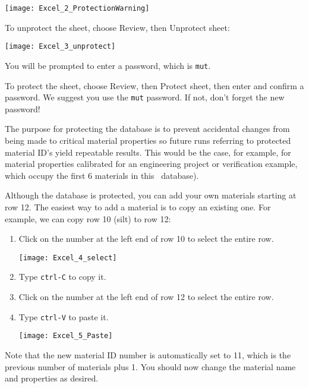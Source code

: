     \texttt{[image: Excel\_2\_ProtectionWarning]}

To unprotect the sheet, choose {\sf Review}, then {\sf Unprotect sheet}:

   \texttt{[image: Excel\_3\_unprotect]}

You will be prompted to enter a password, which is {\tt mut}.

To protect the sheet, choose {\sf Review}, then {\sf Protect sheet}, then enter and confirm a password.  We suggest you use the {\tt mut} password.  If not, don't forget the new password!

The purpose for protecting the database is to prevent accidental changes from being made to critical material properties so future runs referring to protected material ID's yield repeatable results.  This would be the case, for example,  for material properties calibrated for an engineering project or verification example, which occupy the first 6 materials in this \gwf\ database).

Although the database is protected, you can add your own materials starting at row 12.  The easiest way to add a material is to copy an existing one.  For example, we can copy row 10 (silt) to row 12:
\begin{enumerate}
    \item Click on the number {} at the left end of row 10 to select the entire row.

   \texttt{[image: Excel\_4\_select]}

    \item Type {\tt ctrl-C} to copy it.
    \item Click on the number {} at the left end of row 12 to select the entire row.
    \item Type {\tt ctrl-V} to paste it.

   \texttt{[image: Excel\_5\_Paste]}

\end{enumerate}
Note that the new material ID number is automatically set to 11, which is the previous number of materials plus 1. You should now change the material name and properties as desired.

